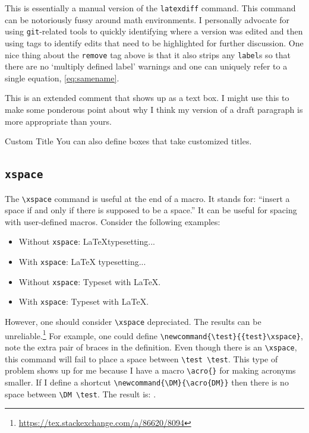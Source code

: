 

This is essentially a manual version of the \texttt{latexdiff} command. This command can be notoriously fussy around math environments. I personally advocate for using \texttt{git}-related tools to quickly identifying where a version was edited and then using tags to identify edits that need to be highlighted for further discussion. One nice thing about the \texttt{remove} tag above is that it also strips any \texttt{label}s so that there are no `multiply defined label' warnings and one can uniquely refer to a single equation, \eqref{eq:samename}.

\begin{flipcomment}
This is an extended comment that shows up as a text box. I might use this to make some ponderous point about why I think my version of a draft paragraph is more appropriate than yours.
\end{flipcomment}

\begin{boxedcomment}{Custom Title}
You can also define boxes that take customized titles. 
\end{boxedcomment}


\subsection{\texorpdfstring{\texttt{xspace}}{xspace}}

The \verb!\xspace! command is useful at the end of a macro. It stands for: ``insert a space if and only if there is supposed to be a space.'' It can be useful for spacing with user-defined macros. Consider the following examples:
\begin{itemize}
	\item Without \texttt{xspace}: \LaTeX typesetting...
	\item With \texttt{xspace}: \LaTeX\xspace typesetting...
	\item Without \texttt{xspace}: Typeset with \LaTeX.
	\item With \texttt{xspace}: Typeset with \LaTeX\xspace.
\end{itemize}
However, one should consider \verb!\xspace! depreciated.  The results can be unreliable.\footnote{\url{https://tex.stackexchange.com/a/86620/8094}}  For example, one could define \verb!\newcommand{\test}{{test}\xspace}!, note the extra pair of braces in the definition. Even though there is an \verb!\xspace!, this command will fail to place a space between \verb!\test \test!. This type of problem shows up for me because I have a macro \verb!\acro{}! for making acronyms smaller. If I define a shortcut \verb!\newcommand{\DM}{\acro{DM}}! then there is no space between \verb!\DM \test!. The result is: \acro{DM}\xspace {test}. 

